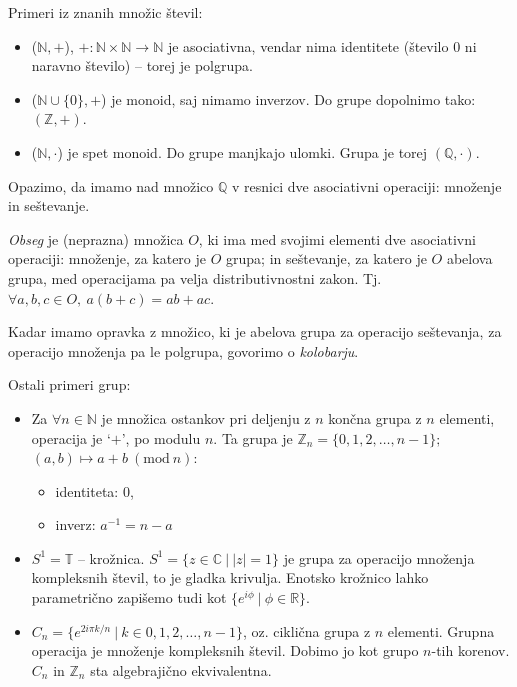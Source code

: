 \ni Primeri iz znanih mno\v zic \v stevil:
\begin{itemize}
	\item{($\mathbb{N},+$), $+: \mathbb{N}\times\mathbb{N} \to \mathbb{N}$ je asociativna, vendar nima identitete
		(\v stevilo $0$ ni naravno \v stevilo) -- torej je polgrupa.}
	\item{($\mathbb{N}\cup\{0\}, +$) je monoid, saj nimamo inverzov. Do grupe dopolnimo tako: $(\mathbb{Z}, +)$.}
	\item{($\mathbb{N},\cdot$) je spet monoid. Do grupe manjkajo ulomki. Grupa je torej $(\mathbb{Q}, \cdot)$.}
\end{itemize}

\ni Opazimo, da imamo nad mno\v zico $\mathbb{Q}$ v resnici dve asociativni operaciji: mno\v zenje in se\v stevanje.

\begin{defin}
	\emph{Obseg} je (neprazna) mno\v zica $O$, ki ima med svojimi elementi dve asociativni operaciji: mno\v zenje, za
	katero je $O$ grupa; in se\v stevanje, za katero je $O$ abelova grupa, med operacijama pa velja distributivnostni zakon.
	Tj. $\forall a,b,c \in O,\ a (b + c) = ab + ac$.
\end{defin}

\ni Kadar imamo opravka z mno\v zico, ki je abelova grupa za operacijo se\v stevanja, za operacijo mno\v zenja pa le polgrupa,
govorimo o \emph{kolobarju}.

Ostali primeri grup:
\begin{itemize}
	\item{Za $\forall n \in \mathbb{N}$ je mno\v zica ostankov pri deljenju z $n$ kon\v cna grupa z $n$ elementi, operacija
		je `$+$', po modulu $n$. Ta grupa je $\mathbb{Z}_n = \{0, 1, 2, \ldots, n-1\};$ $(a,b) \mapsto a + b\ (\text{mod}\ n)$:
		\begin{itemize}
			\item{identiteta: 0,}
			\item{inverz: $a^{-1} = n - a$}
		\end{itemize}}
	\item{$S^1 =\mathbb{T}$ -- kro\v znica. $S^1 = \{z \in \mathbb{C}\ \big|\ |z| = 1\}$ je grupa za operacijo mno\v zenja kompleksnih \v stevil,
		to je gladka krivulja. Enotsko kro\v znico lahko parametri\v cno zapi\v semo tudi kot $\{e^{i\phi}\ |\ \phi \in \mathbb{R}\}$.}
	\item{$C_n = \{e^{2i\pi k/n}\ |\ k \in 0, 1, 2,\ldots,n-1\}$, oz. cikli\v cna grupa z $n$ elementi. Grupna operacija je
		mno\v zenje kompleksnih \v stevil. Dobimo jo kot grupo $n$-tih korenov. $C_n$ in $\mathbb{Z}_n$ sta algebraji\v cno ekvivalentna.}
\end{itemize}

